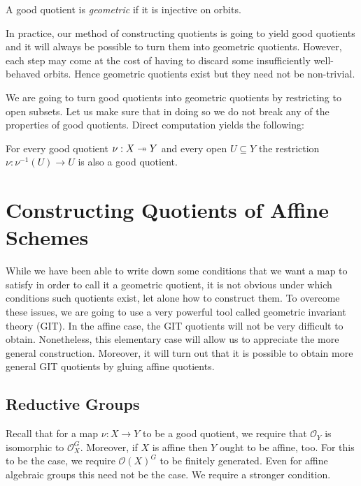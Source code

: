 \documentclass[12pt]{ociamthesis}  %
\begin{document}
\begin{definition}\label{def:geometric_quotient}
  A good quotient is \emph{geometric} if it is injective on orbits.
\end{definition}

In practice, our method of constructing quotients is going to yield
good quotients and it will always be possible to turn them into geometric
quotients. However, each step may come at the cost of having to
discard some insufficiently well-behaved orbits. Hence geometric quotients
exist but they need not be non-trivial.

We are going to turn good quotients into geometric quotients by
restricting to open subsets. Let us make sure that in doing so we
do not break any of the properties of good quotients. Direct computation
yields the following:

\begin{lemma}\label{lem:restrictions_of_good_quotients}
  For every good quotient $\nu:X\twoheadrightarrow Y$ and every open $U\subseteq Y$
  the restriction $\nu : \nu^{-1}(U)\to U$ is
  also a good quotient.
\end{lemma}

\section{Constructing Quotients of Affine Schemes}

While we have been able to write down some conditions that we want
a map to satisfy in order to call it a geometric quotient, it is not
obvious under which conditions such quotients exist, let alone how to
construct them. To overcome these issues, we are going to
use a very powerful tool called geometric invariant theory (GIT).
In the affine case, the GIT quotients will not be very difficult
to obtain. Nonetheless, this elementary case will
allow us to appreciate the more general construction. Moreover,
it will turn out that it is possible to obtain more general
GIT quotients by gluing affine quotients.

\subsection{Reductive Groups}

Recall that for a map $\nu : X\to Y$ to be a good quotient, we
require that $\mathscr O_Y$ is isomorphic to $\mathscr O_X^G$.
Moreover, if $X$ is affine then $Y$ ought to be affine, too. For
this to be the case, we require $\mathscr O(X)^G$ to be
finitely generated. Even for affine algebraic groups this
need not be the case. We require a stronger condition.
\end{document}
